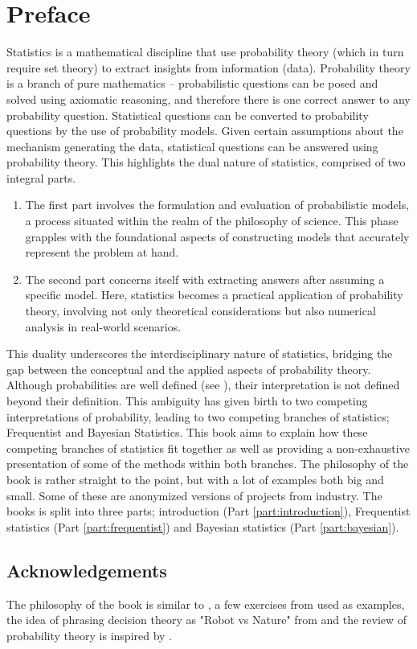 \chapter{Preface}
\label{chp:preface}
Statistics is a mathematical discipline that use probability theory (which in turn require set theory) to extract insights from information (data). Probability theory is a branch of pure mathematics -- probabilistic questions can be posed and solved using axiomatic reasoning, and therefore there is one correct answer to any probability question. Statistical questions can be converted to probability questions by the use of probability models. Given certain assumptions about the mechanism generating the data, statistical questions can be answered using probability theory. This highlights the dual nature of statistics, comprised of two integral parts.
\begin{enumerate}
	\item The first part involves the formulation and evaluation of probabilistic models, a process situated within the realm of the philosophy of science. This phase grapples with the foundational aspects of constructing models that accurately represent the problem at hand.
	\item The second part concerns itself with extracting answers after assuming a specific model. Here, statistics becomes a practical application of probability theory, involving not only theoretical considerations but also numerical analysis in real-world scenarios.
\end{enumerate}
This duality underscores the interdisciplinary nature of statistics, bridging the gap between the conceptual and the applied aspects of probability theory. Although probabilities are well defined (see ), their interpretation is not defined beyond their definition. This ambiguity has given birth to two competing interpretations of probability, leading to two competing branches of statistics; Frequentist and Bayesian Statistics. This book aims to explain how these competing branches of statistics fit together as well as providing a non-exhaustive presentation of some of the methods within both branches. The philosophy of the book is rather straight to the point, but with a lot of examples both big and small. Some of these are anonymized versions of projects from industry. The books is split into three parts; introduction (Part \ref{part:introduction}), Frequentist statistics (Part \ref{part:frequentist}) and Bayesian statistics (Part \ref{part:bayesian}). 


\section{Acknowledgements}
The philosophy of the book is similar to \cite{Sivia2006}, a few exercises from \cite{murphy2023probabilistic} used as examples, the idea of phrasing decision theory as "Robot vs Nature" from \cite{lavalle2006planning} and the review of probability theory is inspired by \cite{chan2021introduction}.